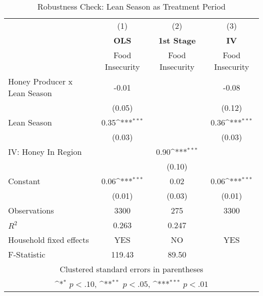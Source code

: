 \begin{table}[htbp]\centering \small
\def\sym#1{\ifmmode^{#1}\else\(^{#1}\)\fi}
\caption{Robustness Check: Lean Season as Treatment Period \label{IV_lean}}
\begin{tabular}{l*{3}{c}}
\toprule
                &\multicolumn{1}{c}{(1)}&\multicolumn{1}{c}{(2)}&\multicolumn{1}{c}{(3)}\\
                &\multicolumn{1}{c}{  \textbf{OLS}  }&\multicolumn{1}{c}{\textbf{1st Stage}}&\multicolumn{1}{c}{ \textbf{IV}}\\
                &Food Insecurity         &Food Insecurity         &Food Insecurity         \\
\midrule
Honey Producer x Lean Season&    -0.01         &                  &    -0.08         \\
                &   (0.05)         &                  &   (0.12)         \\
Lean Season     &     0.35\sym{***}&                  &     0.36\sym{***}\\
                &   (0.03)         &                  &   (0.03)         \\
IV: Honey In Region&                  &     0.90\sym{***}&                  \\
                &                  &   (0.10)         &                  \\
Constant        &     0.06\sym{***}&     0.02         &     0.06\sym{***}\\
                &   (0.01)         &   (0.03)         &   (0.01)         \\
\midrule
Observations    &     3300         &      275         &     3300         \\
\(R^{2}\)       &    0.263         &    0.247         &                  \\
Household fixed effects&      YES         &       NO         &      YES         \\
F-Statistic     &   119.43         &    89.50         &                  \\
\bottomrule
\multicolumn{4}{c}{\footnotesize Clustered standard errors in parentheses}\\
\multicolumn{4}{c}{\footnotesize \sym{*} \(p<.10\), \sym{**} \(p<.05\), \sym{***} \(p<.01\)}\\
\end{tabular}
\end{table}
